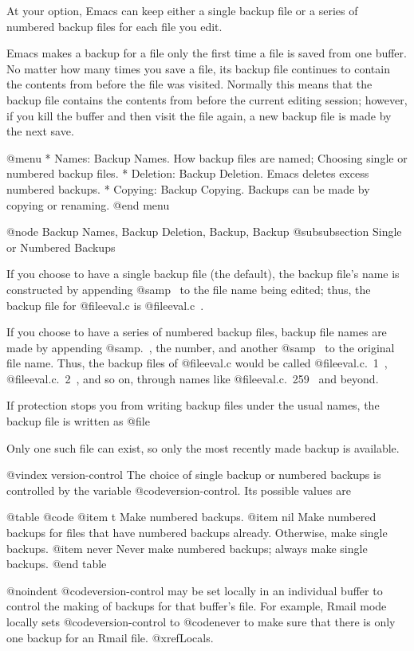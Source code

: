 {{{{{{{{{{{{{{{{  At your option, Emacs can keep either a single backup file or a series of
numbered backup files for each file you edit.

  Emacs makes a backup for a file only the first time a file is saved
from one buffer.  No matter how many times you save a file, its backup file
continues to contain the contents from before the file was visited.
Normally this means that the backup file contains the contents from before
the current editing session; however, if you kill the buffer and then visit
the file again, a new backup file is made by the next save.

@menu
* Names: Backup Names.		How backup files are named;
				Choosing single or numbered backup files.
* Deletion: Backup Deletion.	Emacs deletes excess numbered backups.
* Copying: Backup Copying.	Backups can be made by copying or renaming.
@end menu

@node Backup Names, Backup Deletion, Backup, Backup
@subsubsection Single or Numbered Backups

  If you choose to have a single backup file (the default),
the backup file's name is constructed by appending @samp{~} to the
file name being edited; thus, the backup file for @file{eval.c} is
@file{eval.c~}.

  If you choose to have a series of numbered backup files, backup file
names are made by appending @samp{.~}, the number, and another @samp{~} to
the original file name.  Thus, the backup files of @file{eval.c} would be
called @file{eval.c.~1~}, @file{eval.c.~2~}, and so on, through names
like @file{eval.c.~259~} and beyond.

  If protection stops you from writing backup files under the usual names,
the backup file is written as @file{%
Only one such file can exist, so only the most recently made backup is
available.

@vindex version-control
  The choice of single backup or numbered backups is controlled by the
variable @code{version-control}.  Its possible values are

@table @code
@item t
Make numbered backups.
@item nil
Make numbered backups for files that have numbered backups already.
Otherwise, make single backups.
@item never
Never make numbered backups; always make single backups.
@end table

@noindent
@code{version-control} may be set locally in an individual buffer to
control the making of backups for that buffer's file.  For example,
Rmail mode locally sets @code{version-control} to @code{never} to make sure
that there is only one backup for an Rmail file.  @xref{Locals}.

}}}}}}}}}}}}}}}}}
